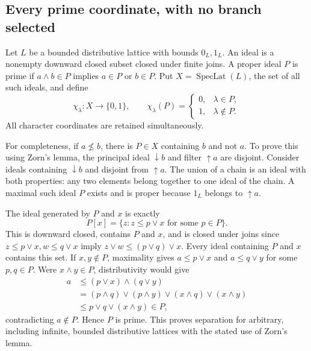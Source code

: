 \subsection{Every prime coordinate, with no branch selected}

Let \(L\) be a bounded distributive lattice with bounds \(0_L,1_L\).
An ideal is a nonempty downward closed subset closed under finite joins.
A proper ideal \(P\) is prime if
\(a\wedge b\in P\) implies \(a\in P\) or \(b\in P\).
Put \(X=\operatorname{SpecLat}(L)\), the set of all such ideals, and define
\begin{equation}\tag{FSI1}
\chi_\lambda:X\longrightarrow\{0,1\},\qquad
\chi_\lambda(P)=
\begin{cases}0,&\lambda\in P,\\1,&\lambda\notin P.\end{cases}
\end{equation}
All character coordinates are retained simultaneously.

For completeness, if \(a\not\le b\), there is \(P\in X\) containing
\(b\) and not \(a\). To prove this using Zorn's lemma, the principal
ideal \(\downarrow b\) and filter \(\uparrow a\) are disjoint.
Consider ideals containing \(\downarrow b\) and disjoint from
\(\uparrow a\). The union of a chain is an ideal with both properties:
any two elements belong together to one ideal of the chain.
A maximal such ideal \(P\) exists and is proper because \(1_L\)
belongs to \(\uparrow a\).

The ideal generated by \(P\) and \(x\) is exactly
\[
P[x]=\{z:z\le p\vee x\text{ for some }p\in P\}.
\]
This is downward closed, contains \(P\) and \(x\), and is closed
under joins since
\(z\le p\vee x,w\le q\vee x\) imply
\(z\vee w\le(p\vee q)\vee x\).
Every ideal containing \(P\) and \(x\) contains this set.
If \(x,y\notin P\), maximality gives
\(a\le p\vee x\) and \(a\le q\vee y\) for some \(p,q\in P\).
Were \(x\wedge y\in P\), distributivity would give
\begin{equation}\tag{FSI2}
\begin{split}
a&\le(p\vee x)\wedge(q\vee y)\\
&=(p\wedge q)\vee(p\wedge y)\vee(x\wedge q)\vee(x\wedge y)\\
&\le p\vee q\vee(x\wedge y)\in P,
\end{split}
\end{equation}
contradicting \(a\notin P\). Hence \(P\) is prime. This proves
separation for arbitrary, including infinite, bounded distributive
lattices with the stated use of Zorn's lemma.

